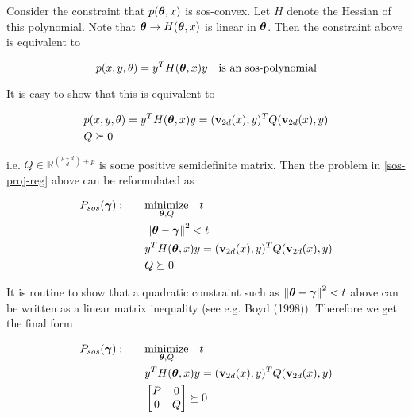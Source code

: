 \documentclass[11pt,reqno]{amsart}
\numberwithin{equation}{section}
\newcommand{\mr}{\mathbb{R}}
\begin{document}
\proof 

Consider the constraint that $p({\boldsymbol\theta}, x)$ is sos-convex. Let $H$ denote the Hessian of this polynomial. Note that ${\boldsymbol\theta} \rightarrow H({\boldsymbol\theta}, x)$ is linear in ${\boldsymbol\theta}$. Then the constraint above is equivalent to 

\begin{equation} \label{proj_1} 
p(x,y,\theta) = y^TH({\boldsymbol\theta}, x) y \quad \text{is an sos-polynomial}
\end{equation} 

It is easy to show that this is equivalent to 

\begin{equation} \label{proj_2} 
\begin{aligned}
&p(x,y,\theta) = y^TH({\boldsymbol\theta}, x) y = ({\bf v}_{2d}(x), y)^T Q ({\bf v}_{2d}(x), y) \\
&Q \succeq 0 
\end{aligned} 
\end{equation}

i.e. $Q \in \mr^{\binom{p + d}{d} + p}$ is some positive semidefinite matrix. Then the problem in \eqref{sos-proj-reg} above can be reformulated as 

\begin{equation} \label{sos-proj-reg3}
\begin{aligned}
 P_{sos}({\boldsymbol\gamma}): \qquad & \underset{{\boldsymbol\theta}, Q}{\text{minimize} } \quad t \\
&\left\lVert {\boldsymbol\theta} - {\boldsymbol\gamma} \right\rVert^2  < t \\
&y^TH({\boldsymbol\theta}, x) y = ({\bf v}_{2d}(x), y)^T Q ({\bf v}_{2d}(x), y) \\
&Q \succeq 0 
\end{aligned}
\end{equation}

It is routine to show that a quadratic constraint such as $\left\lVert {\boldsymbol\theta} - {\boldsymbol\gamma} \right\rVert^2  < t $ above can be written as a linear matrix inequality (see e.g. Boyd (1998)). Therefore we get the final form 

\begin{equation} \label{sos-proj-reg4}
\begin{aligned}
 P_{sos}({\boldsymbol\gamma}): \qquad & \underset{{\boldsymbol\theta}, Q}{\text{minimize} } \quad t \\
&y^TH({\boldsymbol\theta}, x) y = ({\bf v}_{2d}(x), y)^T Q ({\bf v}_{2d}(x), y) \\
&\begin{bmatrix} P & 0\\  0 & Q\end{bmatrix} \succeq 0 
\end{aligned}
\end{equation}
\end{document}
